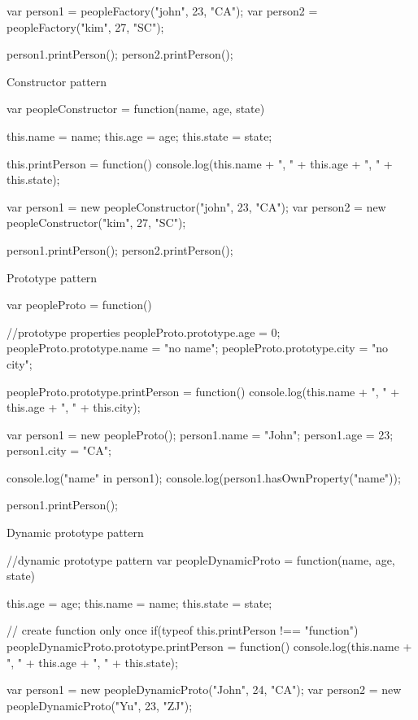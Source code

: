 \documentclass[a4paper,12pt]{article}
\begin{document}
\begin{description}
\begin{jscode}
var person1 = peopleFactory("john", 23, "CA");
var person2 = peopleFactory("kim", 27, "SC");

person1.printPerson();
person2.printPerson();
\end{jscode}

\item Constructor pattern
\begin{jscode}
var peopleConstructor = function(name, age, state){

	this.name = name;
	this.age = age;
	this.state = state;

	this.printPerson = function(){
		console.log(this.name + ", " + this.age + ", " + this.state);
	}
}

var person1 = new peopleConstructor("john", 23, "CA");
var person2 = new peopleConstructor("kim", 27, "SC");

person1.printPerson();
person2.printPerson();
\end{jscode}

\item Prototype pattern
\begin{jscode}
var peopleProto = function(){

}

//prototype properties
peopleProto.prototype.age = 0;
peopleProto.prototype.name = "no name";
peopleProto.prototype.city = "no city";

peopleProto.prototype.printPerson = function(){
	console.log(this.name + ", " + this.age + ", " + this.city);
}

var person1 = new peopleProto();
person1.name = "John";
person1.age = 23;
person1.city = "CA";

console.log("name" in person1);
console.log(person1.hasOwnProperty("name"));

person1.printPerson();
\end{jscode}

\item Dynamic prototype pattern
\begin{jscode}
//dynamic prototype pattern
var peopleDynamicProto = function(name, age, state){
	this.age = age;
	this.name = name;
	this.state = state;

	// create function only once
	if(typeof this.printPerson !== "function"){
		peopleDynamicProto.prototype.printPerson = function(){
			console.log(this.name + ", " + this.age + ", " + this.state);
		}
	}
}

var person1 = new peopleDynamicProto("John", 24, "CA");
var person2 = new peopleDynamicProto("Yu", 23, "ZJ");


\end{jscode}
\end{description}
\end{document}
